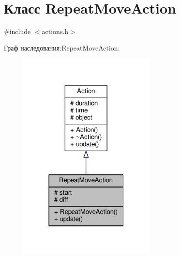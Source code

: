 \hypertarget{class_repeat_move_action}{}\section{Класс Repeat\+Move\+Action}
\label{class_repeat_move_action}


{\ttfamily \#include $<$actions.\+h$>$}



Граф наследования\+:Repeat\+Move\+Action\+:
\nopagebreak
\begin{figure}[H]
\begin{center}
\leavevmode
\includegraphics[width=195pt]{d2/d69/class_repeat_move_action__inherit__graph}
\end{center}
\end{figure}


